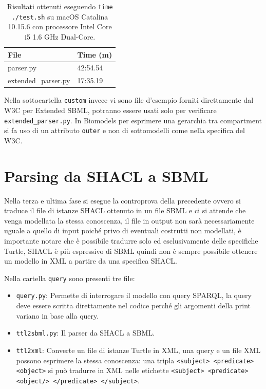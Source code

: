 \documentclass{article}
\begin{document}
\begin{table}[h!t] 
    \centering
    \begin{longtable}{p{}p{}}
        \textbf{File} & \textbf{Time (m)} \\
        \hline
        parser.py & 42:54.54 \\
        extended\_parser.py & 17:35.19 \\
        \hline
    \end{longtable}
    \caption{Risultati ottenuti eseguendo \texttt{time ./test.sh} su macOS Catalina 10.15.6 con processore Intel Core i5 1.6 GHz Dual-Core.}
    \label{tab:performance}
\end{table}

Nella sottocartella \texttt{custom} invece vi sono file d'esempio forniti direttamente dal W3C per Extended SBML, potranno essere usati solo per verificare \texttt{extended\_parser.py}. In Biomodels per esprimere una gerarchia tra compartment si fa uso di un attributo \texttt{outer} e non di sottomodelli come nella specifica del W3C.

\section{Parsing da SHACL a SBML}
Nella terza e ultima fase si esegue la controprova della precedente ovvero si traduce il file di istanze SHACL ottenuto in un file SBML e ci si attende che venga modellata la stessa conoscenza, il file in output non sarà necessariamente uguale a quello di input poiché privo di eventuali costrutti non modellati, è importante notare che è possibile tradurre solo ed esclusivamente delle specifiche Turtle, SHACL è più espressivo di SBML quindi non è sempre possibile ottenere un modello in XML a partire da una specifica SHACL. 

Nella cartella \texttt{query} sono presenti tre file:

\begin{itemize}
    \item \texttt{query.py}: Permette di interrogare il modello con query SPARQL, la query deve essere scritta direttamente nel codice perché gli argomenti della print variano in base alla query.
    \item \texttt{ttl2sbml.py}: Il parser da SHACL a SBML.
    \item \texttt{ttl2xml}: Converte un file di istanze Turtle in XML, una query e un file XML possono esprimere la stessa conoscenza: una tripla \texttt{<subject> <predicate> <object>} si può tradurre in XML nelle etichette \texttt{<subject> <predicate> <object/> </predicate> </subject>}.
\end{itemize}
\end{document}
